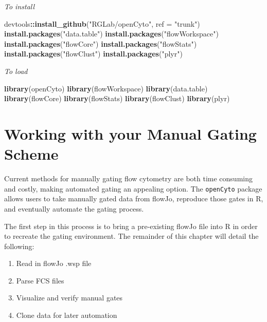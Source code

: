 \documentclass[]{book}
\newenvironment{Shaded}{\begin{snugshade}}{\end{snugshade}}
\newcommand{\DataTypeTok}[1]{\textcolor[rgb]{0.13,0.29,0.53}{#1}}
\newcommand{\KeywordTok}[1]{\textcolor[rgb]{0.13,0.29,0.53}{\textbf{#1}}}
\newcommand{\NormalTok}[1]{#1}
\newcommand{\OperatorTok}[1]{\textcolor[rgb]{0.81,0.36,0.00}{\textbf{#1}}}
\newcommand{\StringTok}[1]{\textcolor[rgb]{0.31,0.60,0.02}{#1}}
\providecommand{\tightlist}{%
  \setlength{\itemsep}{0pt}\setlength{\parskip}{0pt}}
\begin{document}
\emph{To install}

\begin{Shaded}
\begin{Highlighting}[]
\NormalTok{devtools}\OperatorTok{::}\KeywordTok{install_github}\NormalTok{(}\StringTok{"RGLab/openCyto"}\NormalTok{, }\DataTypeTok{ref =} \StringTok{"trunk"}\NormalTok{)}
\KeywordTok{install.packages}\NormalTok{(}\StringTok{"data.table"}\NormalTok{)}
\KeywordTok{install.packages}\NormalTok{(}\StringTok{"flowWorkspace"}\NormalTok{)}
\KeywordTok{install.packages}\NormalTok{(}\StringTok{"flowCore"}\NormalTok{)}
\KeywordTok{install.packages}\NormalTok{(}\StringTok{"flowStats"}\NormalTok{)}
\KeywordTok{install.packages}\NormalTok{(}\StringTok{"flowClust"}\NormalTok{)}
\KeywordTok{install.packages}\NormalTok{(}\StringTok{"plyr"}\NormalTok{)}
\end{Highlighting}
\end{Shaded}

\emph{To load}

\begin{Shaded}
\begin{Highlighting}[]
\KeywordTok{library}\NormalTok{(openCyto)}
\KeywordTok{library}\NormalTok{(flowWorkspace)}
\KeywordTok{library}\NormalTok{(data.table)}
\KeywordTok{library}\NormalTok{(flowCore)}
\KeywordTok{library}\NormalTok{(flowStats)}
\KeywordTok{library}\NormalTok{(flowClust)}
\KeywordTok{library}\NormalTok{(plyr)}
\end{Highlighting}
\end{Shaded}

\hypertarget{working-with-your-manual-gating-scheme}{%
\chapter{Working with your Manual Gating Scheme}\label{working-with-your-manual-gating-scheme}}

Current methods for manually gating flow cytometry are both time consuming and costly, making automated gating an appealing option. The \texttt{openCyto} package allows users to take manually gated data from flowJo, reproduce those gates in R, and eventually automate the gating process.

The first step in this process is to bring a pre-existing flowJo file into R in order to recreate the gating environment. The remainder of this chapter will detail the following:

\begin{enumerate}
\def\labelenumi{\arabic{enumi}.}
\tightlist
\item
  Read in flowJo .wsp file\\
\item
  Parse FCS files\\
\item
  Visualize and verify manual gates
\item
  Clone data for later automation
\end{enumerate}
\end{document}
